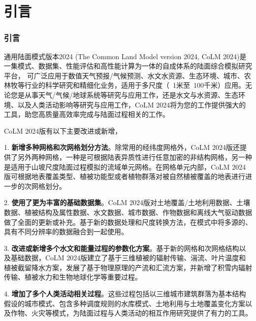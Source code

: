 \part{引言}
\section{引言}


通用陆面模式版本2024 (The Common Land Model version 2024, CoLM 2024)是一集模式、数据集、性能评估和高性能计算为一体的自成体系的陆面综合模拟研究平台， 可广泛应用于数值天气预报/气候预测、水文水资源、生态环境、城市、农林牧等行业的科学研究和精细化业务，适用于多尺度（~1米至~100千米）应用。无论您是从事天气/气候/地球系统等研究与应用工作，还是水文与水资源、生态环境、以及人类活动影响等研究与应用工作，CoLM 2024将为您的工作提供强大的工具，助您高质量高效率完成与陆面过程相关的工作。

CoLM 2024版有以下主要改进或新增，

1. \textbf{新增多种网格和次网格划分方法}。除常用的经纬度网格外，CoLM 2024版还提供了另外两种网格，一种是可根据陆表异质性进行任意加密的非结构网格，另一种是适用于山坡尺度陆面过程模拟的流域单元网格。在网格单元内部，CoLM 2024版可根据地表覆盖类型、植被功能型或者植物群落对被自然植被覆盖的地表进行进一步的次网格划分。

2. \textbf{使用了更为丰富的基础数据集}。CoLM 2024版对土地覆盖/土地利用数据、土壤数据、植被结构及属性数据、水文数据、城市数据、作物数据和离线大气驱动数据做了全面的更新或补充。基于新的数据处理和尺度转换方法，在模式中将多源的、具有不同分辨率的数据融合到一起使用。

3. \textbf{改进或新增多个水文和能量过程的参数化方案}。基于新的网格和次网格结构以及基础数据，CoLM 2024版建立了基于三维植被的辐射传输、湍流、叶片温度和植被截留降水方案，发展了基于物理原理的产流和汇流方案，并新增了积雪内辐射传输、植被水力和生物地球化学等重要过程。

4. \textbf{增加了多个人类活动相关过程}。这些过程包括以三维城市建筑群落为基本结构假设的城市模式、包含多种调度规则的水库模式、土地利用与土地覆盖变化方案以及作物、火灾等模式，为陆面过程与人类活动的相互作用研究提供了有力的工具。

